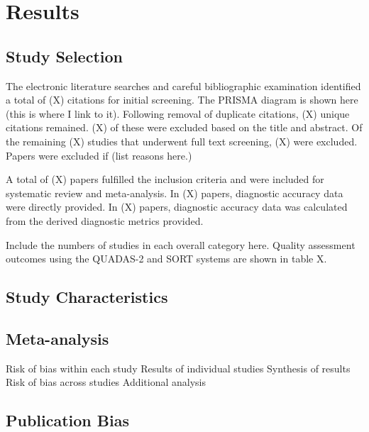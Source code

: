 \section{Results}

\subsection{Study Selection}

The electronic literature searches and careful bibliographic examination identified a total of (X) citations for initial screening.
The PRISMA diagram is shown here (this is where I link to it).
Following removal of duplicate citations, (X) unique citations remained.
(X) of these were excluded based on the title and abstract.
Of the remaining (X) studies that underwent full text screening, (X) were excluded.
Papers were excluded if (list reasons here.)

A total of (X) papers fulfilled the inclusion criteria and were included for systematic review and meta-analysis.
In (X) papers, diagnostic accuracy data were directly provided. 
In (X) papers, diagnostic accuracy data was calculated from the derived diagnostic metrics provided.

Include the numbers of studies in each overall category here.
Quality assessment outcomes using the QUADAS-2 and SORT systems are shown in table X.




\subsection{Study Characteristics}

\subsection{Meta-analysis}

Risk of bias within each study
Results of individual studies
Synthesis of results
Risk of bias across studies
Additional analysis

\subsection{Publication Bias}
